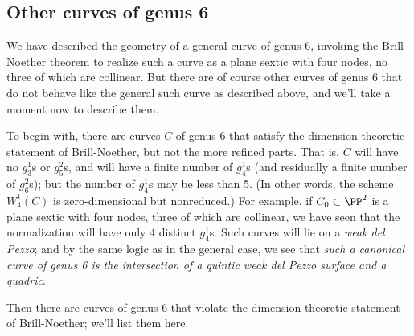 %

\subsection{Other curves of genus 6}

We have described the geometry of a general curve of genus 6, invoking the Brill-Noether theorem to realize such a curve as a plane sextic with four nodes, no three of which are collinear. But there are of course other curves of genus 6 that do not behave like the general such curve as described above, and we'll take a moment now to describe them.

To begin with, there are curves $C$ of genus 6 that satisfy the dimension-theoretic statement of Brill-Noether, but not the more refined parts. That is, $C$ will have no  $g^1_3$s or $g^2_5$s, and will have a finite number of $g^1_4$s (and residually a finite number of $g^2_6$s); but the number of $g^1_4$s may be less than 5. (In other words, the scheme $W^1_4(C)$ is zero-dimensional but nonreduced.) For example, if $C_0 \subset \PP^2$ is a plane sextic with four nodes, three of which are collinear, we have seen that the normalization will have only 4 distinct $g^1_4$s. Such curves will lie on a \emph{weak del Pezzo}; and by the same logic as in the general case, we see that \emph{such a canonical curve of genus 6 is the intersection of a quintic weak del Pezzo surface and a quadric}.

Then there are curves of genus 6 that violate the dimension-theoretic statement of Brill-Noether; we'll list them here. 

